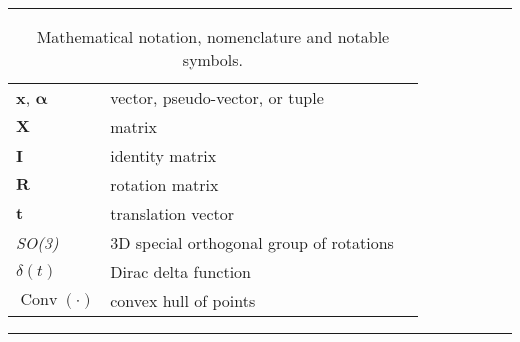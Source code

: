 \begin{table*}[!h]
  \scriptsize
  \centering
  \noindent\rule{\textwidth}{0.5pt}
  \begin{tabular}{lll}
    $\mathbf{x}$, $\bm{\alpha}$ & vector, pseudo-vector, or tuple\\
    $\mathbf{X}$ & matrix \\
    $\mathbf{I}$ & identity matrix \\
    $\mathbf{R}$ & rotation matrix \\
    $\mathbf{t}$ & translation vector \\
    \emph{SO(3)} & 3D special orthogonal group of rotations\\
    $\delta(t)$ & Dirac delta function \\
    $\operatorname{Conv}(\cdot)$ & convex hull of points \\
  \end{tabular}
  \noindent\rule{\textwidth}{0.5pt}
  \caption{Mathematical notation, nomenclature and notable symbols.}
  \label{tab:mathematical_notation}
\end{table*}

